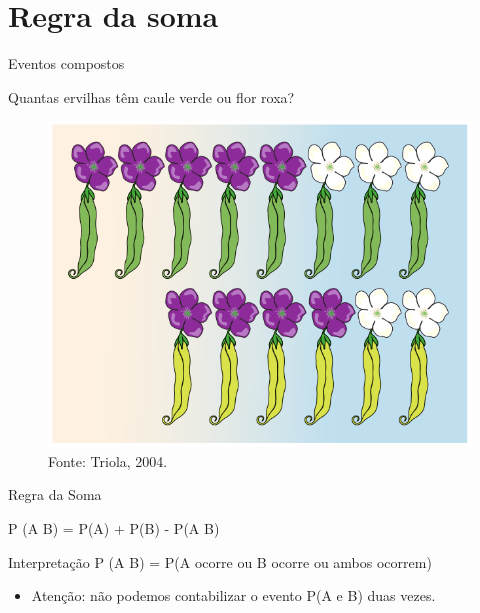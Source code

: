\documentclass{beamer}
\begin{document}
\section{Regra da soma}


\begin{frame}{Eventos compostos}
  \begin{example}
    Quantas ervilhas têm caule verde \alert{ou} flor roxa?
  \end{example}
  \begin{figure}
    \centering
    \includegraphics[height=0.6\textheight]{Prob_I/ervilhas-genetica}
    \caption{Fonte: Triola, 2004.}
  \end{figure}
\end{frame}


\begin{frame}{Regra da Soma}
  \begin{definition}
    P (A  B) = P(A) + P(B) - P(A  B)
  \end{definition}
  \begin{block}{Interpretação}
    P (A  B) = P(A ocorre ou B ocorre ou ambos ocorrem)
  \end{block}
  \begin{itemize}
  \item Atenção: não podemos contabilizar o evento P(A e B) duas
    vezes.
  \end{itemize}
\end{frame}
\end{document}
